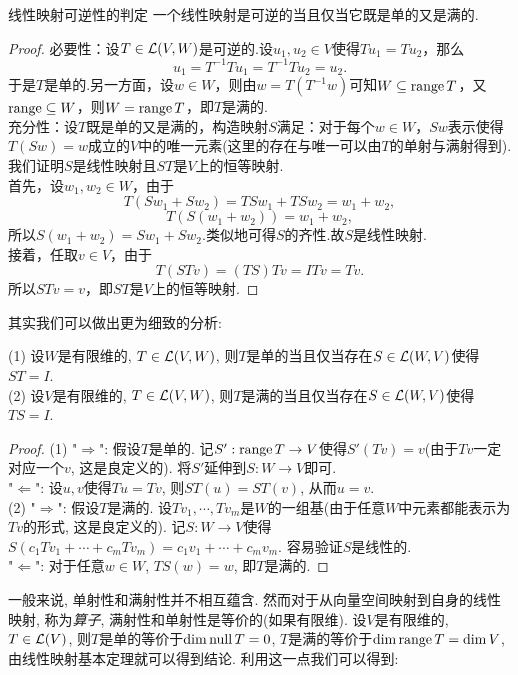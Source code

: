 \begin{proposition}{线性映射可逆性的判定}
	一个线性映射是可逆的当且仅当它既是单的又是满的.
\end{proposition}
\begin{proof}
	 必要性：设$T \in \mathcal{L} (V,W)$是可逆的.设$u_1,u_2 \in V$使得$Tu_1 = Tu_2$，那么$$u_1 = T^{-1} T u_1 = T^{-1} T u_2 = u_2.$$
	于是$T$是单的.另一方面，设$w \in W$，则由$w = T(T^{-1}w)$可知$W \subseteq \operatorname{range} T$，又$\operatorname{range} \subseteq W$，则$W = \operatorname{range} T$，即$T$是满的. \\
	 充分性：设$T$既是单的又是满的，构造映射$S$满足：对于每个$w \in W$，$Sw$表示使得$T(Sw)=w$成立的$V$中的唯一元素(这里的存在与唯一可以由$T$的单射与满射得到).我们证明$S$是线性映射且$ST$是$V$上的恒等映射. \\
	首先，设$w_1,w_2 \in W$，由于$$T(Sw_1+Sw_2)=TSw_1 + TSw_2 = w_1 + w_2,$$
	$$T(S(w_1+w_2)) = w_1+w_2,$$
	所以$S(w_1+w_2)=Sw_1 + Sw_2$.类似地可得$S$的齐性.故$S$是线性映射. \\
	接着，任取$v \in V$，由于$$T(STv) = (TS)Tv=ITv=Tv.$$
	所以$STv=v$，即$ST$是$V$上的恒等映射.
\end{proof}

其实我们可以做出更为细致的分析:

\begin{proposition}{} \label{pro:kenixmxkykuedexiviffxi} %
	(1) 设$W$是有限维的, $T \in \mathcal{L} (V,W)$, 则$T$是单的当且仅当存在$S \in \mathcal{L} (W,V)$使得$ST=I$. \\
	(2) 设$V$是有限维的, $T \in \mathcal{L} (V,W)$, 则$T$是满的当且仅当存在$S \in \mathcal{L} (W,V)$使得$TS=I$.
\end{proposition}
\begin{proof}
	(1) "$\Rightarrow$": 假设$T$是单的. 记$S':\operatorname{range} T \to V$使得$S'(Tv)=v$(由于$Tv$一定对应一个$v$, 这是良定义的). 将$S'$延伸到$S:W \to V$即可. \\
	"$\Leftarrow$": 设$u,v$使得$Tu=Tv$, 则$ST(u)=ST(v)$, 从而$u=v$. \\
	(2) "$\Rightarrow$": 假设$T$是满的. 设$Tv_1,\cdots ,Tv_m$是$W$的一组基(由于任意$W$中元素都能表示为$Tv$的形式, 这是良定义的). 记$S:W \to V$使得$S(c_1Tv_1+\cdots + c_mTv_m)=c_1v_1+\cdots + c_mv_m$. 容易验证$S$是线性的. \\
	"$\Leftarrow$": 对于任意$w \in W$, $TS(w)=w$, 即$T$是满的.
\end{proof}

一般来说, 单射性和满射性并不相互蕴含. 然而对于从向量空间映射到自身的线性映射, 称为\textit{算子}, 满射性和单射性是等价的(如果有限维). 设$V$是有限维的, $T \in \mathcal{L} (V)$, 则$T$是单的等价于$\dim \operatorname{null} T = 0$, $T$是满的等价于$\dim \operatorname{range} T = \dim V$, 由线性映射基本定理就可以得到结论. 利用这一点我们可以得到: 

